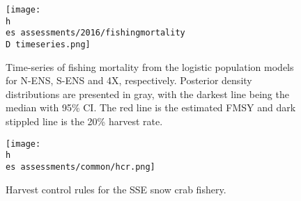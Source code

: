 \documentclass[11pt]{article}
\newcommand{\D}{.}
\newcommand{\h}{\string~}
\newcommand{\es}{bio.data/bio.snowcrab/}
\begin{document}
\begin{figure}
\centering
\texttt{[image: \\h \\es assessments/2016/fishingmortality\\D timeseries.png]}\\
\caption{Time-series of fishing mortality from the logistic population models for N-ENS, S-ENS and 4X, respectively. Posterior density distributions are presented in gray, with the darkest line being the median with 95\% CI. The red line is the estimated FMSY and dark stippled line is the 20\% harvest rate.}
\end{figure}
\clearpage
%
%

\begin{figure}
\centering
\texttt{[image: \\h \\es assessments/common/hcr.png]}\\ 
\caption{Harvest control rules for the SSE snow crab fishery.}
\end{figure}
\clearpage
\end{document}

